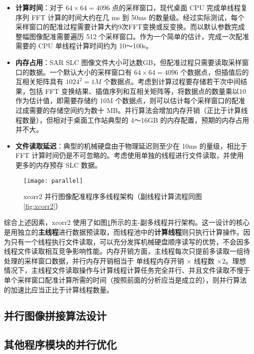\begin{itemize}
    \item \textbf{计算时间}：对于 $64 \times 64 = 4096$ 点的采样窗口，现代桌面 CPU 完成单线程复序列 FFT 计算的时间大约在几 ms 到 50ms 的数量级\cite{fftwbench}。经过实际测试，每个采样窗口的配准过程需要计算大约9次FFT变换或反变换。而以默认参数完成整幅图像配准需要遍历 512 个采样窗口。作为一个简单的估计，完成一次配准需要的 CPU 单线程计算时间约为 10～100s。
    \item \textbf{内存占用}：SAR SLC 图像文件大小可达数GB，但配准过程只需要读取采样窗口的数据。一个默认大小的采样窗口有 $64 \times 64 = 4096$ 个数据点，但插值后的互相关矩阵具有 $1024^2 = 1M$ 个数据点。考虑到计算过程要存储若干次中间结果，包括 FFT 变换结果、插值序列和互相关矩阵等，将数据点的数量乘以10作为估计值，即需要存储约 10M 个数据点，则可以估计每个采样窗口的配准过成需要的存储空间约为数十 MB。并行算法会增加内存开销（正比于计算线程数量），但相对于桌面工作站典型的 4～16GB 的内存配置，预期的内存占用并不大。
    \item \textbf{文件读取延迟}：典型的机械硬盘由于物理延迟则至少在 10ms 的量级\cite{wiki:hddcharacter}，相比于 FFT 计算时间仍是不可忽略的。考虑使用单独的线程进行文件读取，并使用更多的内存预存 SLC 数据。
\end{itemize}

\begin{figure}[ht]
\centering
\texttt{[image: parallel]}
\caption{xcorr2 并行图像配准程序多线程架构（副线程计算流程同图\ref{fig:xcorr2}）} \label{fig:parallel}
\end{figure}

综合上述因素，xcorr2 使用了如图\ref{fig:parallel}所示的主-副多线程并行架构。这一设计的核心是用独立的\textbf{主线程}进行数据预读取，而线程池中的\textbf{计算线程}则只执行计算操作。因为只有一个线程执行文件读取，可以充分发挥机械硬盘顺序读写的优势，不会因多线程文件读取相互竞争影响性能。内存开销方面，主线程每次只提前多读取一组待处理的采样窗口数据，并行内存开销相当于 单线程内存开销 $\times$ 线程数 $\times 2$。理想情况下，主线程文件读取操作与计算线程计算任务完全并行、并且文件读取不慢于单个采样窗口配准计算所需的时间（按照前面的分析应当是成立的），则并行算法的加速比应当正比于计算线程数量。


\subsection{并行图像拼接算法设计}

\subsection{其他程序模块的并行优化}
